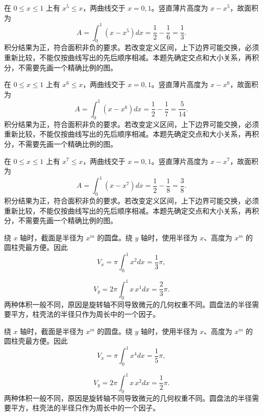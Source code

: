 \documentclass[12pt,fontset=fandol]{ctexart}
\begin{document}
\begin{solve}\label{ans:c21q4}
在 $0\le x\le1$ 上有 $x^{5}\le x$，两曲线交于 $x=0,1$。竖直薄片高度为 $x-x^{5}$，故面积为
\[
A=\int_0^1(x-x^{5})dx=\frac12-\frac1{6}=\frac{1}{3}.
\]
积分结果为正，符合面积非负的要求。若改变定义区间，上下边界可能交换，必须重新比较，不能仅按曲线写出的先后顺序相减。本题先确定交点和大小关系，再积分，不需要先画一个精确比例的图。
\end{solve}

\begin{solve}\label{ans:c21q5}
在 $0\le x\le1$ 上有 $x^{6}\le x$，两曲线交于 $x=0,1$。竖直薄片高度为 $x-x^{6}$，故面积为
\[
A=\int_0^1(x-x^{6})dx=\frac12-\frac1{7}=\frac{5}{14}.
\]
积分结果为正，符合面积非负的要求。若改变定义区间，上下边界可能交换，必须重新比较，不能仅按曲线写出的先后顺序相减。本题先确定交点和大小关系，再积分，不需要先画一个精确比例的图。
\end{solve}

\begin{solve}\label{ans:c21q6}
在 $0\le x\le1$ 上有 $x^{7}\le x$，两曲线交于 $x=0,1$。竖直薄片高度为 $x-x^{7}$，故面积为
\[
A=\int_0^1(x-x^{7})dx=\frac12-\frac1{8}=\frac{3}{8}.
\]
积分结果为正，符合面积非负的要求。若改变定义区间，上下边界可能交换，必须重新比较，不能仅按曲线写出的先后顺序相减。本题先确定交点和大小关系，再积分，不需要先画一个精确比例的图。
\end{solve}

\begin{solve}\label{ans:c21q7}
绕 $x$ 轴时，截面是半径为 $x^m$ 的圆盘。绕 $y$ 轴时，使用半径为 $x$、高度为 $x^m$ 的圆柱壳最方便。因此
\[
V_x=\pi\int_0^1x^{2}dx=\frac{1}{3}\pi,
\]

\[
V_y=2\pi\int_0^1x\,x^{1}dx=\frac{2}{3}\pi.
\]
两种体积一般不同，原因是旋转轴不同导致微元的几何权重不同。圆盘法的半径需要平方，柱壳法的半径只作为周长中的一个因子。
\end{solve}

\begin{solve}\label{ans:c21q8}
绕 $x$ 轴时，截面是半径为 $x^m$ 的圆盘。绕 $y$ 轴时，使用半径为 $x$、高度为 $x^m$ 的圆柱壳最方便。因此
\[
V_x=\pi\int_0^1x^{4}dx=\frac{1}{5}\pi,
\]

\[
V_y=2\pi\int_0^1x\,x^{2}dx=\frac{1}{2}\pi.
\]
两种体积一般不同，原因是旋转轴不同导致微元的几何权重不同。圆盘法的半径需要平方，柱壳法的半径只作为周长中的一个因子。
\end{solve}
\end{document}
